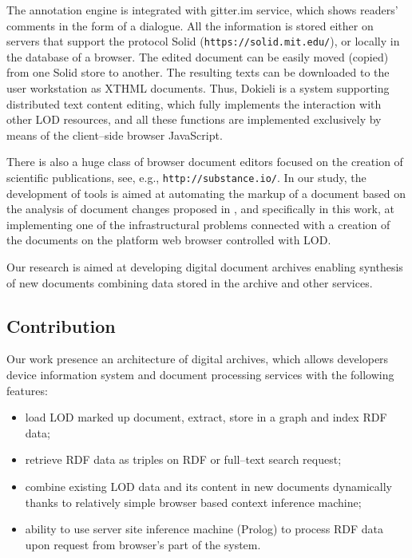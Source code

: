 \documentclass[conference,a4paper]{IEEEtran}
\providecommand\url[1]{\texttt{#1}}
\begin{document}
The annotation engine is integrated with gitter.im service, which shows readers' comments in the form of a dialogue. All the information is stored either on servers that support the protocol Solid (\url{https://solid.mit.edu/}), or locally in the database of a browser. The edited document can be easily moved (copied) from one Solid store to another. The resulting texts can be downloaded to the user workstation as XTHML documents. Thus, Dokieli is a system supporting distributed text content editing, which fully implements the interaction with other LOD resources, and all these functions are implemented exclusively by means of the client--side browser JavaScript.

There is also a huge class of browser document editors focused on the creation of scientific publications, see, e.g., \url{http://substance.io/}. In our study, the development of tools is aimed at automating the markup of a document based on the analysis of document changes proposed in \cite{b14}, and specifically in this work, at implementing one of the infrastructural problems connected with a creation of the documents on the platform web browser controlled with LOD.

Our research is aimed at developing digital document archives enabling
synthesis of new documents combining data stored in the archive and other
services.

\subsection{Contribution}
\label{sec:contr}

Our work presence an architecture of digital archives, which allows
developers device information system and document processing services
with the following features:
\begin{itemize}
\item load LOD marked up document, extract, store in a graph and index RDF data;
\item retrieve RDF data as triples on RDF or full--text search request;
\item combine existing LOD data and its content in new documents dynamically
  thanks to relatively simple browser based context inference machine;
\item ability to use server site inference machine (Prolog) to process RDF data upon
  request from browser's part of the system.
\end{itemize}
\end{document}
